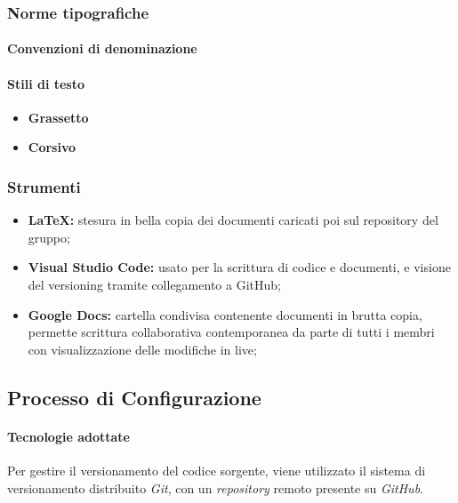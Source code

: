 	\subsubsection{Norme tipografiche}
		\paragraph{Convenzioni di denominazione}   
		\paragraph{Stili di testo} %
			\begin{itemize}
				\item \textbf{Grassetto}
				\item \textbf{Corsivo}
			\end{itemize}
	
						
		
		\subsubsection{Strumenti}
			\begin{itemize}
				\item \textbf{LaTeX:} stesura in bella copia dei documenti caricati poi sul repository del gruppo;
				\item \textbf{Visual Studio Code:} usato per la scrittura di codice e documenti, e visione del versioning tramite collegamento a GitHub;
				\item \textbf{Google Docs:} cartella condivisa contenente documenti in brutta copia, permette scrittura collaborativa contemporanea da parte di tutti i membri con visualizzazione delle modifiche in live;
			\end{itemize}
		
	\subsection{Processo di Configurazione}
		\paragraph{Tecnologie adottate}
			Per gestire il versionamento del codice sorgente, viene utilizzato il sistema di versionamento distribuito \emph{Git}, con un \emph{repository} remoto presente su \emph{GitHub}. %

